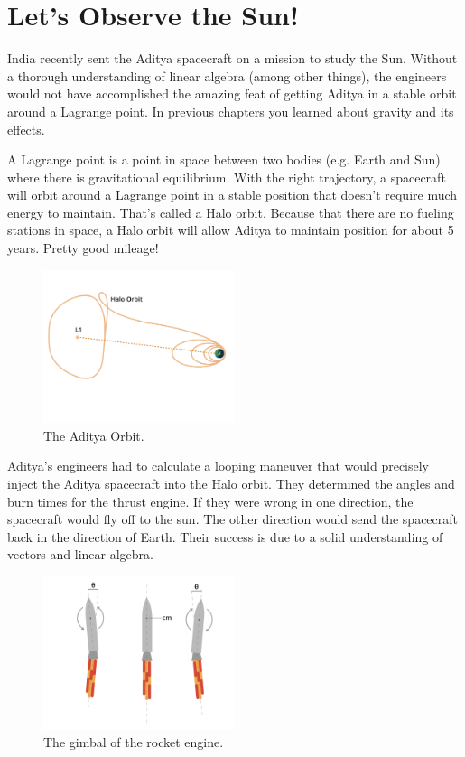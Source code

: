 \section{Let's Observe the Sun!}
India recently sent the Aditya spacecraft on a mission to study the Sun. 
Without a thorough understanding of linear algebra (among other things), the 
engineers would not have accomplished the amazing feat of getting Aditya in a 
stable orbit around a Lagrange point. In previous chapters you learned about 
gravity and its effects. 

A Lagrange point is a point in space between two bodies (e.g. Earth and Sun) 
where there is gravitational equilibrium. With the right trajectory, a 
spacecraft will orbit around a Lagrange point in a stable position that 
doesn’t require much energy to maintain. That’s called a Halo orbit. Because 
that there are no fueling stations in space, a Halo orbit will allow Aditya to 
maintain position for about 5 years. Pretty good mileage!

\begin{figure}[htbp]
    \centering
    \includegraphics[width=0.5\textwidth]{adityaOrbit.png}
    \caption{The Aditya Orbit.}
    \label{fig:adityaOrbit}
\end{figure}

Aditya’s engineers had to calculate a looping maneuver that would precisely 
inject the Aditya spacecraft into the Halo orbit. They determined the angles 
and burn times for the thrust engine. If they were wrong in one direction, the 
spacecraft would fly off to the sun. The other direction would send the 
spacecraft back in the direction of Earth. Their success is due to a solid 
understanding of vectors and linear algebra.

\begin{figure}[htbp]
    \centering
    \includegraphics[width=0.5\textwidth]{gimbalEngine.png}
    \caption{The gimbal of the rocket engine.}
    \label{fig:gimbalEngine}
\end{figure}

